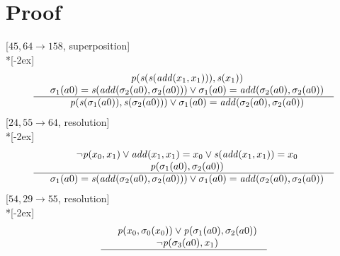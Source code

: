 \documentclass[fleqn]{article}
\newenvironment{VampireProof}{%
   \section{Proof}}{}
\newenvironment{VampireInference}{%
   \begin{array}{c}}{\end{array}}
\newenvironment{VampirePremise}%
   {\begin{array}{l}}%
   {\end{array}}
\newenvironment{VampireConclusion}%
   {\begin{array}{l}}%
   {\end{array}}
\newcommand{\VPremiseSeparator}{\\}
\newcommand{\VConclusionSeparator}{\\ \hline}
\newcommand{\Vor}{\vee}
\begin{document}
\begin{VampireProof}
\[\]
[$45,64\rightarrow 158$, superposition]\\*[-2ex]
\[\begin{VampireInference}
\begin{VampirePremise}%
~~\mathit{p} (\mathit{s} (\mathit{s} (\mathit{add} (x_{1},x_{1}))),\mathit{s} (x_{1}))
\end{VampirePremise}
\VPremiseSeparator
\begin{VampirePremise}%
~~\sigma_{1}(a0) = \mathit{s} (\mathit{add} (\sigma_{2}(a0),\sigma_{2}(a0))) \Vor \sigma_{1}(a0) = \mathit{add} (\sigma_{2}(a0),\sigma_{2}(a0))
\end{VampirePremise}
\VConclusionSeparator
\begin{VampireConclusion}
~~\mathit{p} (\mathit{s} (\sigma_{1}(a0)),\mathit{s} (\sigma_{2}(a0))) \Vor \sigma_{1}(a0) = \mathit{add} (\sigma_{2}(a0),\sigma_{2}(a0))
\end{VampireConclusion}
\end{VampireInference}
\]
[$24,55\rightarrow 64$, resolution]\\*[-2ex]
\[\begin{VampireInference}
\begin{VampirePremise}%
~~\neg \mathit{p} (x_{0},x_{1}) \Vor \mathit{add} (x_{1},x_{1}) = x_{0} \Vor \mathit{s} (\mathit{add} (x_{1},x_{1})) = x_{0}
\end{VampirePremise}
\VPremiseSeparator
\begin{VampirePremise}%
~~\mathit{p} (\sigma_{1}(a0),\sigma_{2}(a0))
\end{VampirePremise}
\VConclusionSeparator
\begin{VampireConclusion}
~~\sigma_{1}(a0) = \mathit{s} (\mathit{add} (\sigma_{2}(a0),\sigma_{2}(a0))) \Vor \sigma_{1}(a0) = \mathit{add} (\sigma_{2}(a0),\sigma_{2}(a0))
\end{VampireConclusion}
\end{VampireInference}
\]
[$54,29\rightarrow 55$, resolution]\\*[-2ex]
\[\begin{VampireInference}
\begin{VampirePremise}%
~~\mathit{p} (x_{0},\sigma_{0}(x_{0})) \Vor \mathit{p} (\sigma_{1}(a0),\sigma_{2}(a0))
\end{VampirePremise}
\VPremiseSeparator
\begin{VampirePremise}%
~~\neg \mathit{p} (\sigma_{3}(a0),x_{1})
\end{VampirePremise}
\VConclusionSeparator
\begin{VampireConclusion}

\end{VampireConclusion}
\end{VampireInference}\]
\end{VampireProof}
\end{document}
